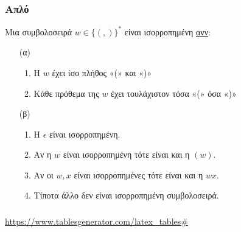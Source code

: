 \documentclass[12pt]{article}
\begin{document}
\subsubsection{Απλό}
\begin{tcolorbox}[title =Ορισμοί ισορροπημένης συμβολοσειράς, colback=white,colbacktitle=white,arc=0mm]
Μια συμβολοσειρά $w \in \{(,)\}^*$ είναι ισορροπημένη \ul{ανν}:
\begin{itemize}
    \item[(α)] 
        \begin{enumerate}
            \item Η $w$ έχει ίσο πλήθος «(» και «)»
            \item Κάθε πρόθεμα της $w$ έχει τουλάχιστον τόσα «(» όσα «)»
        \end{enumerate}
\end{itemize}
    \tcblower
\begin{itemize}
    \item[(β)]
        \begin{enumerate}
                \item H $\epsilon$ είναι ισορροπημένη.
                \item Αν η $w$ είναι ισορροπημένη τότε είναι και η $(w)$.
                \item Αν οι $w, x$ είναι ισορροπημένες τότε είναι και η $wx$.
                \item Τίποτα άλλο δεν είναι ισορροπημένη συμβολοσειρά.
        \end{enumerate}
\end{itemize}
\end{tcolorbox}
\subsubsection{}
\href{https://www.tablesgenerator.com/latex_tables#}{\textlatin{https://www.tablesgenerator.com/latex\_tables\# }}
\end{document}
